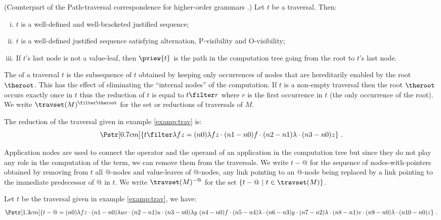 \begin{proposition} (Counterpart of the Path-traversal correspondence for higher-order grammars \cite[proposition 6]{OngHoMchecking2006}.)
\label{prop:pviewtrav_is_path}
Let $t$ be a traversal. Then:
\begin{enumerate}[(i)]
\item $t$ is a well-defined and well-bracketed justified sequence;
\item $t$ is a well-defined justified sequence satisfying alternation, P-visibility and O-visibility;
\item If $t$'s last node is not a value-leaf, then $\pview{t}$ is the path in the computation tree going from the root to $t$'s last node.
\end{enumerate}
\end{proposition}

The  of a traversal $t$ is the subsequence of $t$
obtained by keeping only occurrences of nodes that are hereditarily
enabled by the root $\theroot$. This has the effect of eliminating
the ``internal nodes'' of the computation. If $t$ is a non-empty
traversal then the root $\theroot$ occurs exactly once in $t$ thus
the reduction of $t$ is equal to $t \filter r$ where $r$ is the
first occurrence in $t$ (the only occurrence of the root). We write
$\travset(M)^{\filter \theroot}$ for the set or reductions of
traversals of $M$.
\begin{example}
The reduction of the traversal given in example \ref{examp:trav} is:
$$ \Pstr[0.7cm]{t \filter \lambda f z = (n0){\lambda f z} \cdot (n1-n0){f}\cdot (n2-n1){\lambda }\cdot (n3-n0){z} } \ .$$
\end{example}

Application nodes are used to connect the operator and the operand
of an application in the computation tree but since they do not play
any role in the computation of the term, we can remove them from the
traversals.  We write $t-@$ for the sequence of nodes-with-pointers
obtained by removing from $t$ all @-nodes and value-leaves of
@-nodes, any link pointing to an @-node being replaced by a link
pointing to the immediate predecessor of @ in $t$. We write
$\travset(M)^{-@}$ for the set $\{ t - @ \ | \  t \in \travset(M)
\}$.
\begin{example}
Let $t$ be the traversal given in example \ref{examp:trav}, we have:
  $$\Pstr[1.3cm]{ t - @ = (n0){\lambda f z}\cdot (n1-n0){\lambda u v}\cdot (n2-n1){u}\cdot (n3-n0){\lambda y}\ (n4-n0){f}\cdot (n5-n4){\lambda }\cdot (n6-n3){y}\cdot (n7-n2){\lambda }\cdot (n8-n1){v}\cdot (n9-n0){\lambda }\cdot (n10-n0){z}} \ .$$
\end{example}

